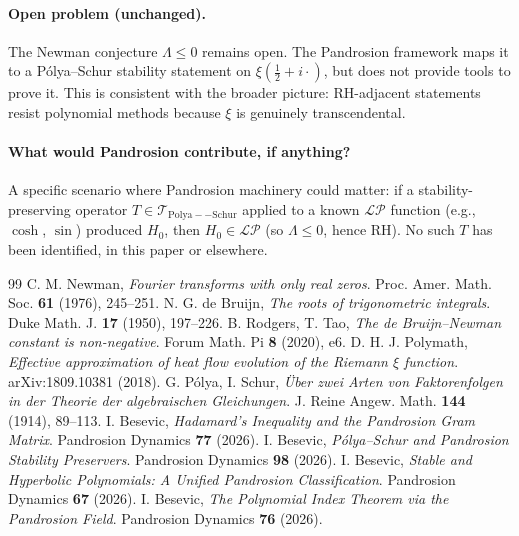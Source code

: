 \documentclass[11pt,a4paper]{article}
\begin{document}
\paragraph{Open problem (unchanged).}
The Newman conjecture $\Lambda \le 0$ remains open. The Pandrosion framework
maps it to a P\'olya--Schur stability statement on
$\xi(\tfrac{1}{2} + i\cdot)$, but does not provide tools to prove it. This is
consistent with the broader picture: RH-adjacent statements resist polynomial
methods because $\xi$ is genuinely transcendental.

\paragraph{What would Pandrosion contribute, if anything?}
A specific scenario where Pandrosion machinery could matter: if a
stability-preserving operator $T \in \mathcal{T}_{\mathrm{Polya--Schur}}$
applied to a known $\mathcal{LP}$ function (e.g., $\cosh$, $\sin$) produced
$H_0$, then $H_0 \in \mathcal{LP}$ (so $\Lambda \le 0$, hence RH).
No such $T$ has been identified, in this paper or elsewhere.

\begin{thebibliography}{99}
 C. M. Newman, \textit{Fourier transforms with only real zeros}.
Proc. Amer. Math. Soc. \textbf{61} (1976), 245--251.
 N. G. de Bruijn, \textit{The roots of trigonometric integrals}.
Duke Math. J. \textbf{17} (1950), 197--226.
 B. Rodgers, T. Tao, \textit{The de Bruijn--Newman constant
is non-negative}. Forum Math. Pi \textbf{8} (2020), e6.
 D. H. J. Polymath, \textit{Effective approximation of heat
flow evolution of the Riemann $\xi$ function}. arXiv:1809.10381 (2018).
 G. P\'olya, I. Schur, \textit{\"Uber zwei Arten von
Faktorenfolgen in der Theorie der algebraischen Gleichungen}.
J. Reine Angew. Math. \textbf{144} (1914), 89--113.
 I. Besevic, \textit{Hadamard's Inequality and the
Pandrosion Gram Matrix}. Pandrosion Dynamics \textbf{77} (2026).
 I. Besevic, \textit{P\'olya--Schur and Pandrosion
Stability Preservers}. Pandrosion Dynamics \textbf{98} (2026).
 I. Besevic, \textit{Stable and Hyperbolic Polynomials:
A Unified Pandrosion Classification}. Pandrosion Dynamics \textbf{67} (2026).
 I. Besevic, \textit{The Polynomial Index Theorem via
the Pandrosion Field}. Pandrosion Dynamics \textbf{76} (2026).
\end{thebibliography}
\end{document}
